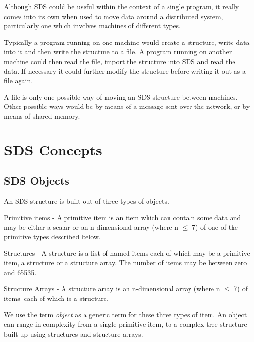 Although SDS could be useful within the context of a single program, it really
comes into its own when used to move data around a distributed system,
particularly one which involves machines of different types. 

Typically a program running on one machine would create a structure, write
data into it and then write the structure to a file. A program running on
another machine could then read the file, import the structure into SDS and
read the data. If necessary it could further modify the structure before
writing it out as a file again.

A file is only one possible way of moving an SDS structure between machines.
Other possible ways would be by means of a message sent over the network, or by
means of shared memory.


\section{SDS Concepts}

\subsection{SDS Objects}

An SDS structure is built out of three types of objects.

\begin{description}

\item{Primitive items} - A primitive item is an item which can contain some
data and may be either a scalar or an n dimensional array (where n $\leq$ 7) 
of one of the primitive types described below.

\item{Structures} - A structure is a list of named items each of which may be a
primitive item, a structure or a structure array. The number of items may be
between zero and 65535.

\item{Structure Arrays} - A structure array is an n-dimensional array (where 
n $\leq$ 7) of items, each of which is a structure.

\end{description}

We use the term {\em object} as a generic term for these three types of item.
An object can range in complexity from a single primitive item, to a complex
tree structure built up using structures and structure arrays.


